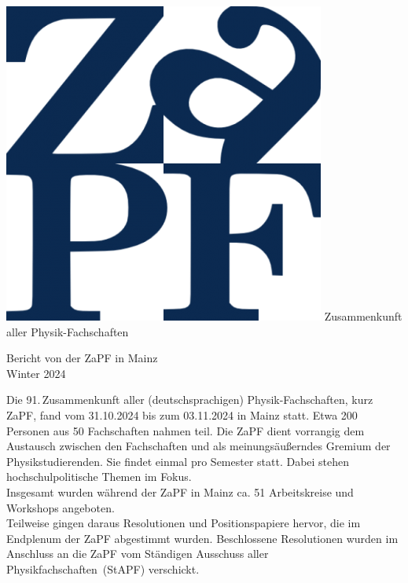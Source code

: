 \documentclass{scrartcl}
\begin{document}
	\hspace{0.74\textwidth}
	\begin{minipage}{0.25\textwidth}
		\vspace{-1cm}
		\centering
		\includegraphics[width=.89\textwidth]{logo.png}
		\small Zusammenkunft aller Physik-Fachschaften
	\end{minipage}
	
	\begin{center}
		\vspace{1.5cm}
		\huge{Bericht von der ZaPF in Mainz \\ Winter 2024}
		\vspace{1cm}
	\end{center}
	
	Die 91.\,Zusammenkunft aller (deutschsprachigen) Physik-Fachschaften, kurz ZaPF, fand vom 31.10.2024 bis zum 03.11.2024 in Mainz statt. Etwa 200 Personen aus 50 Fachschaften nahmen teil.
	Die ZaPF dient vorrangig dem Austausch zwischen den Fachschaften und als meinungsäußerndes Gremium der Physikstudierenden. Sie findet einmal pro Semester statt. Dabei stehen hochschulpolitische Themen im Fokus.\\
	Insgesamt wurden während der ZaPF in Mainz ca. 51 Arbeitskreise und Workshops angeboten.\\
	Teilweise gingen daraus Resolutionen und Positionspapiere hervor, die im Endplenum der ZaPF abgestimmt wurden. Beschlossene Resolutionen wurden im Anschluss an die ZaPF vom Ständigen Ausschuss aller Physikfachschaften~(StAPF) verschickt.
	
\end{document}
